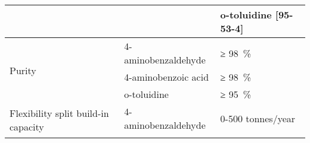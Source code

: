 \begin{landscape}
\begin{table}[h]
\begin{tabular}{@{}lll@{}}
\multicolumn{2}{l}{}                                                     & o-toluidine {[}95-53-4{]}                                                                                                                                                                                                                                                                                                                                                                                             \\ \midrule
\multirow{3}{*}{Purity}                              & 4-aminobenzaldehyde & \SI{≥ 98}{\percent}                                                                                                                                                                                                                                                                                                                                                                                                                \\ \cmidrule(l){2-3} 
                                                     & 4-aminobenzoic acid & \SI{≥ 98}{\percent}                                                                                                                                                                                                                                                                                                                                                                                                                \\ \cmidrule(l){2-3} 
                                                     & o-toluidine         & \SI{≥ 95}{\percent}                                                                                                                                                                                                                                                                                                                                                                                                                \\ \midrule
\multirow{3}{*}{Flexibility split build-in capacity} & 4-aminobenzaldehyde & 0-500 tonnes/year                                                                                                                                                                                                                                                                                                                                                                                                     \\ \cmidrule(l){2-3} 

\end{tabular}
\end{table}
\end{landscape}
